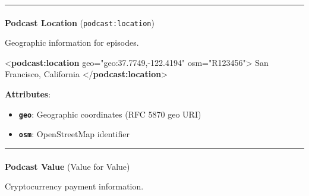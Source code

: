 \documentclass[
  letterpaper,
  DIV=11,
  numbers=noendperiod]{scrartcl}
\makeatletter
\let\oldparagraph\paragraph
\renewcommand{\paragraph}{
    \@ifstar
      \xxxParagraphStar
      \xxxParagraphNoStar
  }
\newcommand{\xxxParagraphStar}[1]{\oldparagraph*{#1}\mbox{}}
\newcommand{\xxxParagraphNoStar}[1]{\oldparagraph{#1}\mbox{}}
\newenvironment{Shaded}{\begin{snugshade}}{\end{snugshade}}
\newcommand{\KeywordTok}[1]{\textcolor[rgb]{0.00,0.23,0.31}{\textbf{#1}}}
\newcommand{\NormalTok}[1]{\textcolor[rgb]{0.00,0.23,0.31}{#1}}
\newcommand{\OtherTok}[1]{\textcolor[rgb]{0.00,0.23,0.31}{#1}}
\newcommand{\StringTok}[1]{\textcolor[rgb]{0.13,0.47,0.30}{#1}}
\providecommand{\tightlist}{%
  \setlength{\itemsep}{0pt}\setlength{\parskip}{0pt}}\usepackage{longtable,booktabs,array}
\makeatother
\begin{document}
\begin{center}\rule{0.5\linewidth}{0.5pt}\end{center}

\paragraph{\texorpdfstring{\textbf{Podcast Location}
(\texttt{podcast:location})}{Podcast Location (podcast:location)}}\label{podcast-location-podcastlocation}

Geographic information for episodes.

\begin{Shaded}
\begin{Highlighting}[]
\NormalTok{\textless{}}\KeywordTok{podcast:location} 
\OtherTok{    geo=}\StringTok{"geo:37.7749,{-}122.4194"} 
\OtherTok{    osm=}\StringTok{"R123456"}\NormalTok{\textgreater{}}
\NormalTok{  San Francisco, California}
\NormalTok{\textless{}/}\KeywordTok{podcast:location}\NormalTok{\textgreater{}}
\end{Highlighting}
\end{Shaded}

\textbf{Attributes}:

\begin{itemize}
\tightlist
\item
  \textbf{\texttt{geo}}: Geographic coordinates (RFC 5870 geo URI)
\item
  \textbf{\texttt{osm}}: OpenStreetMap identifier
\end{itemize}

\begin{center}\rule{0.5\linewidth}{0.5pt}\end{center}

\paragraph{\texorpdfstring{\textbf{Podcast Value} (Value for
Value)}{Podcast Value (Value for Value)}}\label{podcast-value-value-for-value}

Cryptocurrency payment information.
\end{document}
